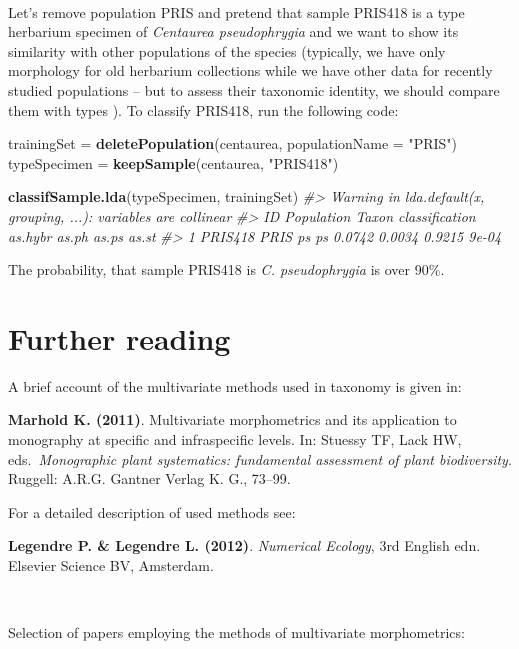 \documentclass[
]{article}
\newenvironment{Shaded}{\begin{snugshade}}{\end{snugshade}}
\newcommand{\CommentTok}[1]{\textcolor[rgb]{0.56,0.35,0.01}{\textit{#1}}}
\newcommand{\DataTypeTok}[1]{\textcolor[rgb]{0.13,0.29,0.53}{#1}}
\newcommand{\KeywordTok}[1]{\textcolor[rgb]{0.13,0.29,0.53}{\textbf{#1}}}
\newcommand{\NormalTok}[1]{#1}
\newcommand{\StringTok}[1]{\textcolor[rgb]{0.31,0.60,0.02}{#1}}
\begin{document}
~

Let's remove population PRIS and pretend that sample PRIS418 is a type
herbarium specimen of \emph{Centaurea pseudophrygia} and we want to show
its similarity with other populations of the species (typically, we have
only morphology for old herbarium collections while we have other data
for recently studied populations -- but to assess their taxonomic
identity, we should compare them with types ). To classify PRIS418, run
the following code:

\begin{Shaded}
\begin{Highlighting}[]
\NormalTok{trainingSet =}\StringTok{ }\KeywordTok{deletePopulation}\NormalTok{(centaurea, }\DataTypeTok{populationName =} \StringTok{"PRIS"}\NormalTok{)}
\NormalTok{typeSpecimen =}\StringTok{ }\KeywordTok{keepSample}\NormalTok{(centaurea, }\StringTok{"PRIS418"}\NormalTok{)}

\KeywordTok{classifSample.lda}\NormalTok{(typeSpecimen, trainingSet)}
\CommentTok{#> Warning in lda.default(x, grouping, ...): variables are collinear}
\CommentTok{#>        ID Population Taxon classification as.hybr  as.ph  as.ps as.st}
\CommentTok{#> 1 PRIS418       PRIS    ps             ps  0.0742 0.0034 0.9215 9e-04}
\end{Highlighting}
\end{Shaded}

The probability, that sample PRIS418 is \emph{C. pseudophrygia} is over
90\%.

\hypertarget{further-reading}{%
\section{Further reading}\label{further-reading}}

A brief account of the multivariate methods used in taxonomy is given
in:

\textbf{Marhold K. (2011)}. Multivariate morphometrics and its
application to monography at specific and infraspecific levels. In:
Stuessy TF, Lack HW, eds.~\emph{Monographic plant systematics:
fundamental assessment of plant biodiversity}. Ruggell: A.R.G. Gantner
Verlag K. G., 73--99.

For a detailed description of used methods see:

\textbf{Legendre P. \& Legendre L. (2012)}. \emph{Numerical Ecology},
3rd English edn. Elsevier Science BV, Amsterdam.

~

Selection of papers employing the methods of multivariate morphometrics:
\end{document}
